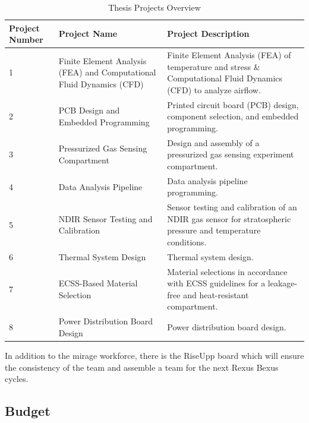\documentclass[
  a4paper,
  11pt,
  openany,
  parskip,
  toc=totoc,
  listof=totoc,
  bibliography=totoc
]{scrreprt}
\begin{document}
\begin{table}[htbp]
\centering
\caption{Thesis Projects Overview}
\label{tab:thesis}
\begin{tabular}{|l|L{3.5cm}|L{5.5cm}|}
\hline
\textbf{Project Number} & \textbf{Project Name} & \textbf{Project Description} \\ \hline

1 & Finite Element Analysis (FEA) and Computational Fluid Dynamics (CFD) 
& Finite Element Analysis (FEA) of temperature and stress \& Computational Fluid Dynamics (CFD) to analyze airflow. 
\\ \hline

2 & PCB Design and Embedded Programming 
& Printed circuit board (PCB) design, component selection, and embedded programming. 
\\ \hline

3 & Pressurized Gas Sensing Compartment 
& Design and assembly of a pressurized gas sensing experiment compartment. 
 \\ \hline

4 & Data Analysis Pipeline 
& Data analysis pipeline programming. 
 \\ \hline

5 & NDIR Sensor Testing and Calibration 
& Sensor testing and calibration of an NDIR gas sensor for stratospheric pressure and temperature conditions. 
 \\ \hline

6 & Thermal System Design 
& Thermal system design. 
 \\ \hline

7 & ECSS-Based Material Selection 
& Material selections in accordance with ECSS guidelines for a leakage-free and heat-resistant compartment. 
 \\ \hline

8 & Power Distribution Board Design 
& Power distribution board design. 
\\ \hline

\end{tabular}
\end{table}

In addition to the \gls{mirage} workforce, there is the RiseUpp board which will ensure the consistency of the team and assemble a team for the next Rexus Bexus cycles.
\clearpage

\subsection{Budget}
\end{document}
